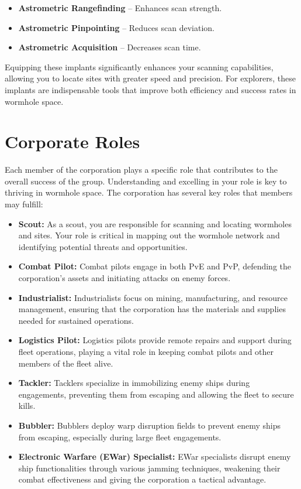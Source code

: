 \documentclass[a4paper,12pt]{report}
\begin{document}
\begin{itemize}
    \item \textbf{Astrometric Rangefinding} – Enhances scan strength.
    \item \textbf{Astrometric Pinpointing} – Reduces scan deviation.
    \item \textbf{Astrometric Acquisition} – Decreases scan time.
\end{itemize}

Equipping these implants significantly enhances your scanning capabilities, allowing you to locate sites with greater speed and precision. For explorers, these implants are indispensable tools that improve both efficiency and success rates in wormhole space.

\chapter{Corporate Roles}

Each member of the corporation plays a specific role that contributes to the overall success of the group. Understanding and excelling in your role is key to thriving in wormhole space. The corporation has several key roles that members may fulfill:
\begin{itemize}
    \item \textbf{Scout:} As a scout, you are responsible for scanning and locating wormholes and sites. Your role is critical in mapping out the wormhole network and identifying potential threats and opportunities.
    \item \textbf{Combat Pilot:} Combat pilots engage in both PvE and PvP, defending the corporation's assets and initiating attacks on enemy forces.
    \item \textbf{Industrialist:} Industrialists focus on mining, manufacturing, and resource management, ensuring that the corporation has the materials and supplies needed for sustained operations.
    \item \textbf{Logistics Pilot:} Logistics pilots provide remote repairs and support during fleet operations, playing a vital role in keeping combat pilots and other members of the fleet alive.
    \item \textbf{Tackler:} Tacklers specialize in immobilizing enemy ships during engagements, preventing them from escaping and allowing the fleet to secure kills.
    \item \textbf{Bubbler:} Bubblers deploy warp disruption fields to prevent enemy ships from escaping, especially during large fleet engagements.
    \item \textbf{Electronic Warfare (EWar) Specialist:} EWar specialists disrupt enemy ship functionalities through various jamming techniques, weakening their combat effectiveness and giving the corporation a tactical advantage.
\end{itemize}
\end{document}
